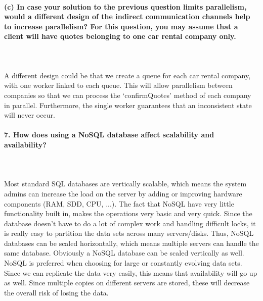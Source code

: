 \documentclass{ds-report}
\begin{document}
\paragraph{(c) In case your solution to the previous question limits parallelism, would a different design of
the indirect communication channels help to increase parallelism? For this question, you may
assume that a client will have quotes belonging to one car rental company only.}\mbox{}\\\\
A different design could be that we create a queue for each car rental company, with one worker linked to each queue. This will allow parallelism between companies so that we can process the `confirmQuotes' method of each company in parallel. Furthermore, the single worker guarantees that an inconsistent state will never occur.
 

	\paragraph{7.  How does using a NoSQL database affect scalability and availability?} \mbox{}\\\\
Most standard SQL databases are vertically scalable, which means the system admins can increase the load on the server by adding or improving hardware components (RAM, SDD, CPU, ...).  
	The fact that NoSQL have very little functionality built in, makes the operations very basic and very quick. Since the database doesn't have to do a lot of complex work and handling difficult locks, it is really easy to partition the data sets across many servers/disks. Thus, NoSQL databases can be scaled horizontally, which means multiple servers can handle the same database. Obviously a NoSQL database can be scaled vertically as well. NoSQL is preferred when choosing for large or constantly evolving data sets.\mbox{}\\
Since we can replicate the data very easily, this means that availability will go up as well. Since multiple copies on different servers are stored, these will decrease the overall risk of losing the data.
	
\end{document}
